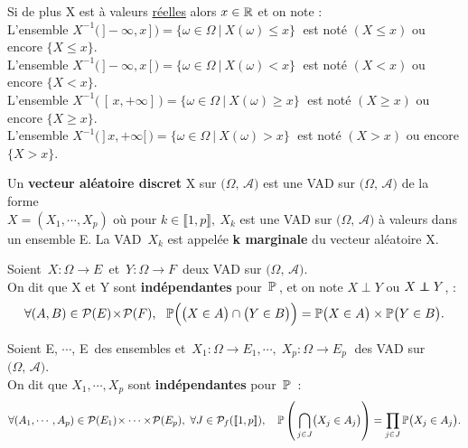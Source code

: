 Si de plus X est à valeurs \underline{réelles} alors \(x\in \mathbb{R}\) et on note :\vspace{0.1cm}\\
L'ensemble \(X^{-1}\bigl(\,]-\!\infty,x\,]\,\bigr)=\{\omega\in \Omega \ \vert \ X(\omega)\leq x\}\;\) est noté \((X\leq x)\) ou encore \(\{X\leq x\}\).\vspace{0.1cm}\\
L'ensemble \(X^{-1}\bigl(\,]-\!\infty,x\,[\,\bigr)=\{\omega\in \Omega \ \vert \ X(\omega)< x\}\;\) est noté \((X< x)\) ou encore \(\{X< x\}\).\vspace{0.1cm}\\
L'ensemble \(X^{-1}\bigl(\,[\,x,+\infty]\,\bigr)=\{\omega\in \Omega \ \vert \ X(\omega)\geq x\}\;\) est noté \((X\geq x)\) ou encore \(\{X\geq x\}\).\vspace{0.1cm}\\
L'ensemble \(X^{-1}\bigl(\,]\,x,+\infty[\,\bigr)=\{\omega\in \Omega \ \vert \ X(\omega)> x\}\;\) est noté \((X> x)\) ou encore \(\{X> x\}\).

\vspace{1.6cm}

Un \textbf{vecteur aléatoire discret} X sur \(\bigl(\Omega,\,\mathcal{A}\bigr)\) est une VAD sur \(\bigl(\Omega,\,\mathcal{A}\bigr)\) de la forme\\
\(X=(X_1,\cdots,X_p)\) où pour \(k\in \llbracket 1,p \rrbracket,\ X_k\) est une VAD sur \(\bigl(\Omega,\,\mathcal{A}\bigr)\) à valeurs dans un ensemble E. La VAD \(\,X_k\) est appelée \textbf{k marginale} du vecteur aléatoire X.

\vspace{1.5cm}

Soient \(\,X:\Omega \to E\,\) et \(\,Y:\Omega \to F\,\) deux VAD sur \(\bigl(\Omega,\,\mathcal{A}\bigr)\).\\
On dit que X et Y sont \textbf{indépendantes} pour \(\,\mathbb{P}\,\), et on note \(X\perp Y\) ou \(X\perp\!\!\!\!\perp Y\), \ssi :\vspace{-0.25cm}
\[\forall (A,B)\in \mathcal{P}(E)\!\times\! \mathcal{P}(F),\ \ \mathbb{P}\Bigl(\bigl(X\in A\bigr)\cap \bigl(Y\in B\bigr)\Bigr)=\mathbb{P}\bigl(X\in A\bigr)\times\mathbb{P}\bigl(Y\in B\bigr).\]

\vspace{1.3cm}

Soient E, $\cdots$, E\, des ensembles et \(\,X_1:\Omega \to E_1 , \cdots,\; X_p: \Omega \to E_p\;\) des VAD sur \(\bigl(\Omega,\,\mathcal{A}\bigr)\).\\
On dit que \(X_1,\cdots,X_p\) sont \textbf{indépendantes} pour \(\,\mathbb{P}\,\) \ssi :\vspace{-0.3cm}
\[\forall (A_1,\cdots,A_p)\in\mathcal{P}(E_1)\!\times\cdots\times\! \mathcal{P}(E_p),\ \forall J\in \mathcal{P}_f(\llbracket 1,p \rrbracket),\quad \mathbb{P}\left(\,\bigcap_{j\in J}\bigl(X_j\in A_j\bigr) \right)=\prod_{j\in J}\mathbb{P}\bigl(X_j\in A_j\bigr).\]

